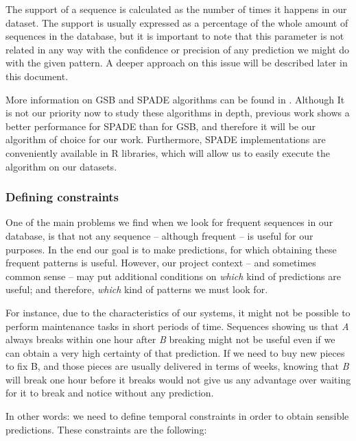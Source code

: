 \documentclass[a4paper,12pt]{article}
\begin{document}
The support of a sequence is calculated as the number of times it happens in our dataset. The support is usually expressed as a percentage of the whole amount of sequences in the database, but it is important to note that this parameter is not related in any way with the confidence or precision of any prediction we might do with the given pattern. A deeper approach on this issue will be described later in this document.

More information on GSB and SPADE algorithms can be found in \cite{zaki2001spade, zhao2003sequential, srikant1996mining}. Although It is not our priority now to study these algorithms in depth, previous work shows a better performance for SPADE than for GSB, and therefore it will be our algorithm of choice for our work. Furthermore, SPADE implementations are conveniently available in R libraries, which will allow us to easily execute the algorithm on our datasets.

\subsubsection{Defining constraints}
One of the main problems we find when we look for frequent sequences in our database, is that not any sequence -- although frequent -- is useful for our purposes. In the end our goal is to make predictions, for which obtaining these frequent patterns is useful. However, our project context -- and sometimes common sense -- may put additional conditions on \emph{which} kind of predictions are useful; and therefore, \emph{which} kind of patterns we must look for.

For instance, due to the characteristics of our systems, it might not be possible to perform maintenance tasks in short periods of time. Sequences showing us that \emph{A} always breaks within one hour after \emph{B} breaking might not be useful even if we can obtain a very high certainty of that prediction. If we need to buy new pieces to fix B, and those pieces are usually delivered in terms of weeks, knowing that \emph{B} will break one hour before it breaks would not give us any advantage over waiting for it to break and notice without any prediction.

In other words: we need to define temporal constraints in order to obtain sensible predictions\cite{zaki2000cspade}. These constraints are the following:
\end{document}
